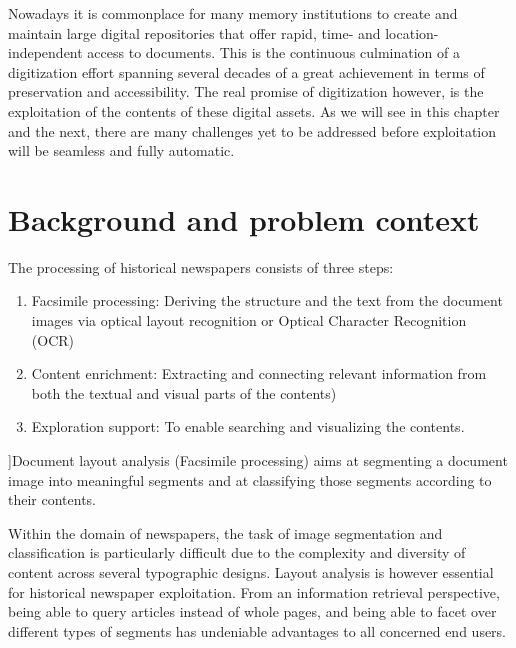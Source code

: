 \documentclass[english, bibtex]{kththesis}
\begin{document}
Nowadays it is commonplace for many memory institutions to create and maintain large digital repositories that offer rapid, time- and location-independent access to documents. This is the continuous culmination of a digitization effort spanning several decades of a great achievement in terms of preservation and accessibility. The real promise of digitization however, is the exploitation of the contents of these digital assets. \cite{jdmdh:7097} As we will see in this chapter and the next, there are many challenges yet to be addressed before exploitation will be seamless and fully automatic. 

\section{Background and problem context}
\label{sec:background}

The processing of historical newspapers consists of three steps: 
\begin{enumerate}
\item Facsimile processing: Deriving the structure and the text from the document images via optical layout recognition or Optical Character Recognition (\gls{OCR})
\item Content enrichment: Extracting and connecting relevant information from both the textual and visual parts of the contents)
\item Exploration support: To enable searching and visualizing the contents.  
\end{enumerate}

]Document layout analysis (Facsimile processing) aims at segmenting a document image into meaningful segments and at classifying those segments according to their contents. \cite{ESKENAZI20171} 
    
Within the domain of newspapers, the task of image segmentation and classification is particularly difficult due to the complexity and diversity of content across several typographic designs. Layout analysis is however essential for historical newspaper exploitation. From an information retrieval perspective, being able to query articles instead of whole pages, and being able to facet over different types of segments has undeniable advantages to all concerned end users. 

\end{document}
